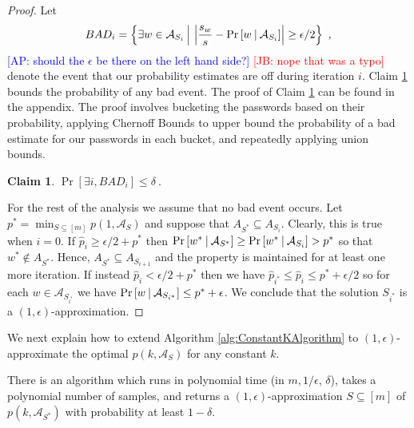 \documentclass[prodmode,acmec]{ec-acmsmall}
\newcommand{\kibitz}[2]{\ifnum\Comments=1\textcolor{#1}{#2}\fi}
\newcommand{\ap}[1]{\kibitz{blue} {[AP: #1]}}
\newcommand{\jb}[1]{\kibitz{red} {[JB: #1]}}
\newtheorem{claim}[theorem]{Claim}
\begin{document}
\begin{proof}
Let
\[BAD_i = \left\{\exists w \in \mathcal{A}_{S_i}~\vline~ \left|\frac{s_w}{s} - \Pr\left[w ~\vline~\mathcal{A}_{S_i} \right]\right| \geq \epsilon/2 \right\} \ , \] \ap{should the $\epsilon$ be there on the left hand side?} \jb{nope that was a typo} denote the event that our probability estimates are off during iteration $i$. Claim \ref{claim:SamplingBadEvent} bounds the probability of any bad event. The proof of Claim \ref{claim:SamplingBadEvent} can be found in the appendix. The proof involves bucketing the passwords based on their probability, applying Chernoff Bounds to upper bound the probability of a bad estimate for our passwords in each bucket, and repeatedly applying union bounds. 

\begin{claim}\label{claim:SamplingBadEvent}
$ \Pr\left[\exists i, BAD_i\right] \leq \delta \  . $ 
\end{claim} 

For the rest of the analysis we assume that no bad event occurs. Let $p^* = \min_{S \subseteq [m]} p\left(1,\mathcal{A}_S\right)$ and suppose that $A_{S^*} \subseteq A_{S_i}$. Clearly, this is true when $i=0$.  If $\hat{p}_i \geq \epsilon/2 + p^*$ then $\Pr\left[w^*~\vline~\mathcal{A}_{S^*}\right] \geq \Pr\left[w^*~\vline~\mathcal{A}_{S_i}\right] > p^*$ so that $w^* \notin A_{S^*}$. Hence, $A_{S^*} \subseteq A_{S_{i+1}}$ and the property is maintained for at least one more iteration. If instead $\hat{p}_i < \epsilon/2 + p^*$ then we have $\hat{p}_{i^*} \leq \hat{p}_i \leq p^* + \epsilon/2$ so for each $w \in \mathcal{A}_{S_{i^*}}$ we have $\Pr\left[w ~\vline~\mathcal{A}_{S_{i^*}} \right] \leq p^* + \epsilon$. We conclude that the solution $S_{i^*}$ is a $(1,\epsilon)$-approximation.
\end{proof}

We next explain how to extend Algorithm \ref{alg:ConstantKAlgorithm} to $(1,\epsilon)$-approximate the optimal $p\left(k,\mathcal{A}_S\right)$ for any constant $k$.

\begin{theorem}
There is an algorithm which runs in polynomial time (in $m, 1/\epsilon$, $\delta$), takes a polynomial number of samples, and returns a $(1,\epsilon)$-approximation $S \subseteq [m]$ of $p\left(k,\mathcal{A}_{S^*}\right)$ with probability at least $1-\delta$.
\end{theorem}
\end{document}
